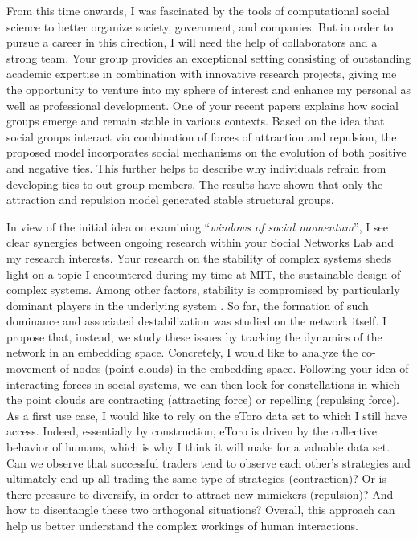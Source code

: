 From this time onwards, I was fascinated by the tools of computational social science to better organize society, government, and companies. 
But in order to pursue a career in this direction, I will need the help of collaborators and a strong team. 
Your group provides an exceptional setting consisting of outstanding academic expertise in combination with innovative research projects, giving me the opportunity to venture into my sphere of interest and enhance my personal as well as professional development.
One of your recent papers \cite{stadtfeld2020emergence} explains how social groups emerge and remain stable in various contexts.
Based on the idea that social groups interact via combination of forces of attraction and repulsion, the proposed model incorporates social mechanisms on the evolution of both positive and negative ties.
This further helps to describe why individuals refrain from developing ties to out-group members.
The results have shown that only the attraction and repulsion model generated stable structural groups.

In view of the initial idea on examining ``\textit{windows of social momentum}'', I see clear synergies between ongoing research within your Social Networks Lab and my research interests. 
Your research on the stability of complex systems sheds light on a topic I encountered during my time at MIT, the sustainable design of complex systems.
Among other factors, stability is compromised by particularly dominant players in the underlying system \cite{lera2017prediction}.
So far, the formation of such dominance and associated destabilization was studied on the network itself. 
I propose that, instead, we study these issues by tracking the dynamics of the network in an embedding space. 
Concretely, I would like to analyze the co-movement of nodes (point clouds) in the embedding space. 
Following your idea of interacting forces in social systems, we can then look for constellations in which the point clouds are contracting (attracting force) or repelling (repulsing force). 
As a first use case, I would like to rely on the eToro data set to which I still have access. 
Indeed, essentially by construction, eToro is driven by the collective behavior of humans, which is why I think it will make for a valuable data set. 
Can we observe that successful traders tend to observe each other's strategies and ultimately end up all trading the same type of strategies (contraction)? 
Or is there pressure to diversify, in order to attract new mimickers (repulsion)? 
And how to disentangle these two orthogonal situations? 
Overall, this approach can help us better understand the complex workings of human interactions. 

